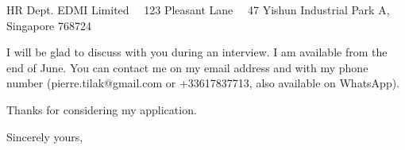\documentclass{scrlttr2}
\renewcommand{\\}{\ {\large\textperiodcentered}\ }
\begin{document}
\begin{letter}{ %
HR Dept. EDMI Limited\\
123 Pleasant Lane\\
47 Yishun Industrial Park A, \\
Singapore 768724
}
	

I will be glad to discuss with you during an interview. I am available from the
	end of June. You can contact me on my email address and with my phone
	number (pierre.tilak@gmail.com or +33617837713, also available on WhatsApp).

Thanks for considering my application.

%
%
%
%
Sincerely yours, \\ \\ \\


\end{letter}
\end{document}
